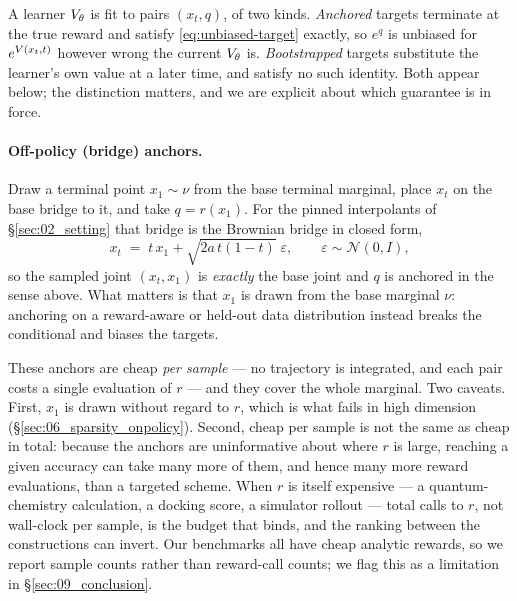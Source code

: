 A learner $V_\theta$ is fit to pairs $(x_t, q)$, of two kinds. \emph{Anchored} targets terminate at the true reward and satisfy
\eqref{eq:unbiased-target} exactly, so $e^{q}$ is unbiased for $e^{V(x_t,t)}$
however wrong the current $V_\theta$ is. \emph{Bootstrapped} targets
substitute the learner's own value at a later time, and satisfy no such
identity. Both appear below; the distinction matters, and we are explicit about
which guarantee is in force.

\paragraph{Off-policy (bridge) anchors.}
Draw a terminal point $x_1\sim\nu$ from the base terminal marginal, place $x_t$
on the base bridge to it, and take $q=r(x_1)$. For the pinned interpolants of
\S\ref{sec:02_setting} that bridge is the Brownian bridge in closed form,
\begin{equation}
  x_t \;=\; t\,x_1 + \sqrt{2a\,t(1-t)}\;\varepsilon,
  \qquad \varepsilon\sim\mathcal{N}(0,I),
  \label{eq:fwd-bridge}
\end{equation}
so the sampled joint $(x_t,x_1)$ is \emph{exactly} the base joint and $q$ is
anchored in the sense above. What matters is that $x_1$ is drawn from the base
marginal $\nu$: anchoring on a reward-aware or held-out data distribution
instead breaks the conditional and biases the targets.

These anchors are cheap \emph{per sample} --- no trajectory is integrated, and
each pair costs a single evaluation of $r$ --- and they cover the whole
marginal. Two caveats. First, $x_1$ is drawn without regard to $r$, which is
what fails in high dimension (\S\ref{sec:06_sparsity_onpolicy}). Second, cheap
per sample is not the same as cheap in total: because the anchors are
uninformative about where $r$ is large, reaching a given accuracy can take many
more of them, and hence many more reward evaluations, than a targeted scheme.
When $r$ is itself expensive --- a quantum-chemistry calculation, a docking
score, a simulator rollout --- total calls to $r$, not wall-clock per sample,
is the budget that binds, and the ranking between the constructions can invert.
Our benchmarks all have cheap analytic rewards, so we report sample counts
rather than reward-call counts; we flag this as a limitation in
\S\ref{sec:09_conclusion}.

